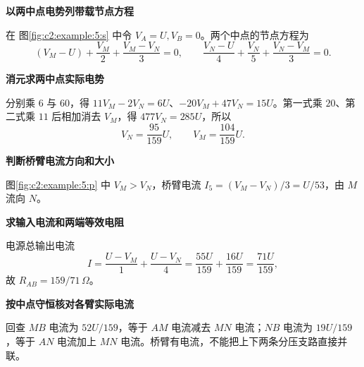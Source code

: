 \begin{solution}\textbf{以两中点电势列带载节点方程}\par\nobreak
在 图\ref{fig:c2:example:5:s} 中令 $V_A=U,V_B=0$。两个中点的节点方程为
\[
 (V_M-U)+\frac{V_M}{2}+\frac{V_M-V_N}{3}=0,\qquad
 \frac{V_N-U}{4}+\frac{V_N}{5}+\frac{V_N-V_M}{3}=0.
\]


\par\medskip{}\noindent\textbf{消元求两中点实际电势}\par\nobreak
分别乘 $6$ 与 $60$，得 $11V_M-2V_N=6U$、$-20V_M+47V_N=15U$。第一式乘 $20$、第二式乘 $11$ 后相加消去 $V_M$，得 $477V_N=285U$，所以
\[
 V_N=\frac{95}{159}U,\qquad V_M=\frac{104}{159}U.
\]



\par\medskip{}\noindent\textbf{判断桥臂电流方向和大小}\par\nobreak
图\ref{fig:c2:example:5:p} 中 $V_M>V_N$，桥臂电流 $I_5=(V_M-V_N)/3=U/53$，由 $M$ 流向 $N$。

\par\medskip{}\noindent\textbf{求输入电流和两端等效电阻}\par\nobreak
电源总输出电流
\[
 I=\frac{U-V_M}{1}+\frac{U-V_N}{4}
 =\frac{55U}{159}+\frac{16U}{159}=\frac{71U}{159},
\]
故 $R_{AB}=159/71\,\Omega$。

\par\medskip{}\noindent\textbf{按中点守恒核对各臂实际电流}\par\nobreak
回查 $MB$ 电流为 $52U/159$，等于 $AM$ 电流减去 $MN$ 电流；$NB$ 电流为 $19U/159$，等于 $AN$ 电流加上 $MN$ 电流。桥臂有电流，不能把上下两条分压支路直接并联。\end{solution}

